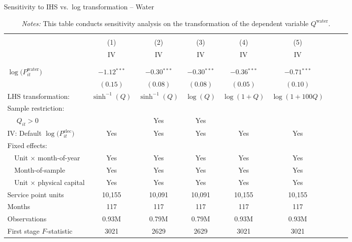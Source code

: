 \begin{table}[t!]\centering
\small
\caption{Sensitivity to IHS vs.\ log transformation -- Water  \label{tab:water_regs_ihs_logs}}
\vspace{-0.1cm}
\small
\begin{adjustbox}{center} 
\begin{tabular}{lcccccccc} 
\hline \hline
\vspace{-0.37cm}
\\
 & (1)  & (2)  & (3)  & (4)  & (5)   \\ 
[0.1em]
 & IV & IV & IV & IV & IV  \\
\vspace{-0.37cm}
\\
\cline{2-6}
\vspace{-0.27cm}
\\
 $\log\big(P^{\text{water}}_{it}\big)$ ~ & $-1.12$$^{***}$  & $-0.30$$^{***}$ & $-0.30$$^{***}$ & $-0.36$$^{***}$ & $-0.71$$^{***}$ \\ 
& $(0.15)$ & $(0.08)$ & $(0.08)$ & $(0.05)$ & $(0.10)$  \\
[1.5em] 
LHS transformation: & $ \sinh^{-1}(Q) $ & $ \sinh^{-1}(Q) $ & $\log(Q)$  & $\log(1+Q)$   &  $\log(1+100Q)$  \\
[1.5em] 
Sample restriction: \\
~~ $Q_{it} > 0$ &  &Yes &Yes  &   &    \\
[1em] 
IV: Default $\log\big(P^{\text{elec}}_{it}\big)$  & Yes & Yes & Yes  & Yes  &  Yes \\
[1em] 
Fixed effects: \\
[0.1em] 
~~Unit $\times$ month-of-year  & Yes  & Yes  & Yes  & Yes  & Yes   \\ 
[0.1em] 
~~Month-of-sample  & Yes  & Yes  & Yes  & Yes  & Yes     \\ 
[0.1em] 
~~Unit $\times$ physical capital & Yes & Yes & Yes & Yes & Yes  \\
[1em] 
Service point units & 10,155 & 10,091 & 10,091 & 10,155 & 10,155   \\ 
[0.1em] 
Months  & 117 & 117 & 117 & 117 & 117  \\ 
[0.1em] 
Observations & 0.93M & 0.79M & 0.79M & 0.93M & 0.93M  \\ 
[0.1em] 
First stage $F$-statistic & 3021 & 2629 & 2629 & 3021 & 3021  \\ 
[0.15em]
\hline
\end{tabular}
\end{adjustbox}
\captionsetup{width=\textwidth}
\caption*{\scriptsize \emph{Notes:} This table conducts sensitivity analysis on the transformation of the dependent variable $Q^{\text{water}}$.
}
\end{table}
